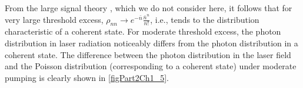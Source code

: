 



From the large signal theory \cite{bScally1974}, which we do not consider here, it follows that for very large threshold excess, 
$\rho_{nn} \rightarrow e^{-\bar{n}}\frac{\bar{n}^n}{n!}$, i.e., tends to the distribution characteristic of a coherent state. For moderate threshold excess, the photon distribution in laser radiation noticeably differs from the photon distribution in a coherent state. The difference between the photon distribution in the laser field and the Poisson distribution 
(corresponding to a coherent state) under moderate pumping is clearly shown in \autoref{figPart2Ch1_5}.